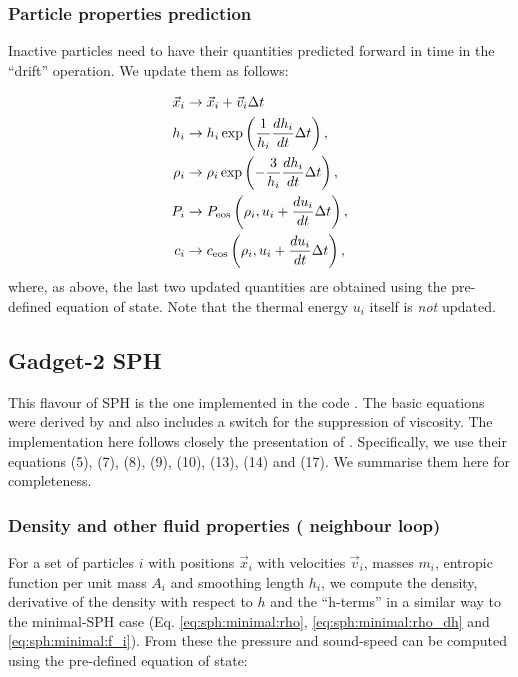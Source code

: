 \subsubsection{Particle properties prediction}

Inactive particles need to have their quantities predicted forward in
time in the ``drift'' operation. We update them as follows:

\begin{align}
  \vec{x}_i &\rightarrow \vec{x}_i + \vec{v}_i \Delta t 
\label{eq:sph:minimal:drift_x} \\
  h_i &\rightarrow h_i \exp\left(\frac{1}{h_i} \frac{dh_i}{dt}
  \Delta t\right), \label{eq:sph:minimal:drift_h}\\
  \rho_i &\rightarrow \rho_i \exp\left(-\frac{3}{h_i} \frac{dh_i}{dt}
  \Delta t\right), \label{eq:sph:minimal:drift_rho} \\
  P_i &\rightarrow P_{\rm eos}\left(\rho_i, u_i + \frac{du_i}{dt} \Delta
t\right), \label{eq:sph:minimal:drift_P}\\
  c_i &\rightarrow c_{\rm eos}\left(\rho_i, u_i + \frac{du_i}{dt}
  \Delta t\right) \label{eq:sph:minimal:drift_c},
\end{align}
where, as above, the last two updated quantities are obtained using
the pre-defined equation of state. Note that the thermal energy $u_i$
itself is \emph{not} updated.


\subsection{Gadget-2 SPH}
\label{sec:sph:gadget2}

This flavour of SPH is the one implemented in the  code
\citep{Springel2005}. The basic equations were derived by
\cite{Springel2002} and also includes a \cite{Balsara1995} switch for
the suppression of viscosity. The implementation here follows closely the
presentation of \cite{Springel2005}. Specifically, we use their equations (5),
(7), (8), (9), (10), (13), (14) and (17). We summarise them here for
completeness.

\subsubsection{Density and other fluid properties ( neighbour loop)}

For a set of particles $i$ with positions $\vec{x}_i$ with velocities
$\vec{v}_i$, masses $m_i$, entropic function per unit mass $A_i$ and
smoothing length $h_i$, we compute the density, derivative of the density with
respect to $h$ and the ``h-terms'' in a similar way to the minimal-SPH case
(Eq. \ref{eq:sph:minimal:rho}, \ref{eq:sph:minimal:rho_dh} and
\ref{eq:sph:minimal:f_i}). From these the pressure and sound-speed can
be computed using the pre-defined equation of state:

